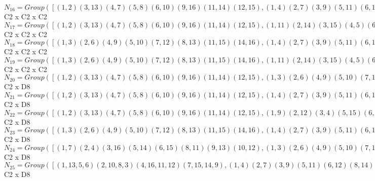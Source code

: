 \documentclass[varwidth=\maxdimen,border=10]{standalone}
\begin{document}
\begin{tabular}
$N_{16} = Group( [ ( 1, 2)( 3,13)( 4, 7)( 5, 8)( 6,10)( 9,16)(11,14)(12,15), ( 1, 4)( 2, 7)( 3, 9)( 5,11)( 6,12)( 8,14)(10,15)(13,16), ( 1, 5)( 2, 8)( 3,10)( 4,11)( 6,13)( 7,14)( 9,15)(12,16) ] )\cong$ C2 x C2 x C2\ \\
$N_{17} = Group( [ ( 1, 2)( 3,13)( 4, 7)( 5, 8)( 6,10)( 9,16)(11,14)(12,15), ( 1,11)( 2,14)( 3,15)( 4, 5)( 6,16)( 7, 8)( 9,10)(12,13), ( 1, 4)( 2, 7)( 3, 9)( 5,11)( 6,12)( 8,14)(10,15)(13,16) ] )\cong$ C2 x C2 x C2\ \\
$N_{18} = Group( [ ( 1, 3)( 2, 6)( 4, 9)( 5,10)( 7,12)( 8,13)(11,15)(14,16), ( 1, 4)( 2, 7)( 3, 9)( 5,11)( 6,12)( 8,14)(10,15)(13,16), ( 1, 5)( 2, 8)( 3,10)( 4,11)( 6,13)( 7,14)( 9,15)(12,16) ] )\cong$ C2 x C2 x C2\ \\
$N_{19} = Group( [ ( 1, 3)( 2, 6)( 4, 9)( 5,10)( 7,12)( 8,13)(11,15)(14,16), ( 1,11)( 2,14)( 3,15)( 4, 5)( 6,16)( 7, 8)( 9,10)(12,13), ( 1, 4)( 2, 7)( 3, 9)( 5,11)( 6,12)( 8,14)(10,15)(13,16) ] )\cong$ C2 x C2 x C2\ \\
$N_{20} = Group( [ ( 1, 2)( 3,13)( 4, 7)( 5, 8)( 6,10)( 9,16)(11,14)(12,15), ( 1, 3)( 2, 6)( 4, 9)( 5,10)( 7,12)( 8,13)(11,15)(14,16), ( 1, 5)( 2, 8)( 3,10)( 4,11)( 6,13)( 7,14)( 9,15)(12,16), ( 1, 4)( 2, 7)( 3, 9)( 5,11)( 6,12)( 8,14)(10,15)(13,16) ] )\cong$ C2 x D8\ \\
$N_{21} = Group( [ ( 1, 2)( 3,13)( 4, 7)( 5, 8)( 6,10)( 9,16)(11,14)(12,15), ( 1, 4)( 2, 7)( 3, 9)( 5,11)( 6,12)( 8,14)(10,15)(13,16), ( 1, 5)( 2, 8)( 3,10)( 4,11)( 6,13)( 7,14)( 9,15)(12,16), ( 1, 3)( 2, 6)( 4, 9)( 5,10)( 7,12)( 8,13)(11,15)(14,16) ] )\cong$ C2 x D8\ \\
$N_{22} = Group( [ ( 1, 2)( 3,13)( 4, 7)( 5, 8)( 6,10)( 9,16)(11,14)(12,15), ( 1, 9)( 2,12)( 3, 4)( 5,15)( 6, 7)( 8,16)(10,11)(13,14), ( 1, 5)( 2, 8)( 3,10)( 4,11)( 6,13)( 7,14)( 9,15)(12,16), ( 1, 3)( 2, 6)( 4, 9)( 5,10)( 7,12)( 8,13)(11,15)(14,16) ] )\cong$ C2 x D8\ \\
$N_{23} = Group( [ ( 1, 3)( 2, 6)( 4, 9)( 5,10)( 7,12)( 8,13)(11,15)(14,16), ( 1, 4)( 2, 7)( 3, 9)( 5,11)( 6,12)( 8,14)(10,15)(13,16), ( 1, 5)( 2, 8)( 3,10)( 4,11)( 6,13)( 7,14)( 9,15)(12,16), ( 1, 2)( 3,13)( 4, 7)( 5, 8)( 6,10)( 9,16)(11,14)(12,15) ] )\cong$ C2 x D8\ \\
$N_{24} = Group( [ ( 1, 7)( 2, 4)( 3,16)( 5,14)( 6,15)( 8,11)( 9,13)(10,12), ( 1, 3)( 2, 6)( 4, 9)( 5,10)( 7,12)( 8,13)(11,15)(14,16), ( 1, 5)( 2, 8)( 3,10)( 4,11)( 6,13)( 7,14)( 9,15)(12,16), ( 1, 2)( 3,13)( 4, 7)( 5, 8)( 6,10)( 9,16)(11,14)(12,15) ] )\cong$ C2 x D8\ \\
$N_{25} = Group( [ ( 1,13, 5, 6)( 2,10, 8, 3)( 4,16,11,12)( 7,15,14, 9), ( 1, 4)( 2, 7)( 3, 9)( 5,11)( 6,12)( 8,14)(10,15)(13,16), ( 1, 5)( 2, 8)( 3,10)( 4,11)( 6,13)( 7,14)( 9,15)(12,16), ( 1, 2)( 3,13)( 4, 7)( 5, 8)( 6,10)( 9,16)(11,14)(12,15) ] )\cong$ C2 x D8\ \\

\end{tabular}
\end{document}
